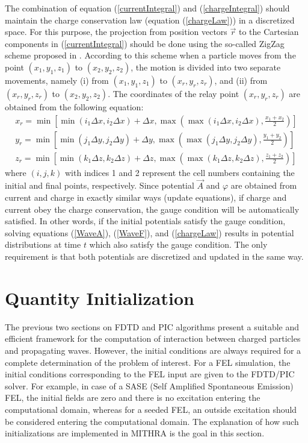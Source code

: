 The combination of equation (\ref{currentIntegral}) and (\ref{chargeIntegral}) should maintain the charge conservation law (equation (\ref{chargeLaw})) in a discretized space.
%
For this purpose, the projection from position vectors $\vec{r}$ to the Cartesian components in (\ref{currentIntegral}) should be done using the so-called ZigZag scheme proposed in \cite{umeda2003new}.
%
According to this scheme when a particle moves from the point $(x_1,y_1,z_1)$ to $(x_2,y_2,z_2)$, the motion is divided into two separate movements, namely (i) from $(x_1,y_1,z_1)$ to $(x_r,y_r,z_r)$, and (ii) from $(x_r,y_r,z_r)$ to $(x_2,y_2,z_2)$.
%
The coordinates of the relay point $(x_r,y_r,z_r)$ are obtained from the following equation:
%
\begin{align}
x_r = \min\left[ \min(i_1 \Delta x,i_2 \Delta x) + \Delta x, \nonumber \max\left( \max(i_1 \Delta x,i_2 \Delta x), \frac{x_1+x_2}{2} \right) \right] \nonumber \\
y_r = \min\left[ \min(j_1 \Delta y,j_2 \Delta y) + \Delta y, \nonumber \max\left( \max(j_1 \Delta y,j_2 \Delta y), \frac{y_1+y_2}{2} \right) \right] \\
z_r = \min\left[ \min(k_1 \Delta z,k_2 \Delta z) + \Delta z, \nonumber \max\left( \max(k_1 \Delta z,k_2 \Delta z), \frac{z_1+z_2}{2} \right) \right] \nonumber
\end{align}
%
where $(i,j,k)$ with indices 1 and 2 represent the cell numbers containing the initial and final points, respectively.
%
Since potential $\vec{A}$ and $\varphi$ are obtained from current and charge in exactly similar ways (update equations), if charge and current obey the charge conservation, the gauge condition will be automatically satisfied.
%
In other words, if the initial potentials satisfy the gauge condition, solving equations (\ref{WaveA}), (\ref{WaveF}), and (\ref{chargeLaw}) results in potential distributions at time $t$ which also satisfy the gauge condition.
%
The only requirement is that both potentials are discretized and updated in the same way.

\section{Quantity Initialization}

The previous two sections on FDTD and PIC algorithms present a suitable and efficient framework for the computation of interaction between charged particles and propagating waves.
%
However, the initial conditions are always required for a complete determination of the problem of interest.
%
For a FEL simulation, the initial conditions corresponding to the FEL input are given to the FDTD/PIC solver.
%
For example, in case of a SASE (Self Amplified Spontaneous Emission) FEL, the initial fields are zero and there is no excitation entering the computational domain, whereas for a seeded FEL, an outside excitation should be considered entering the computational domain.
%
The explanation of how such initializations are implemented in MITHRA is the goal in this section.

